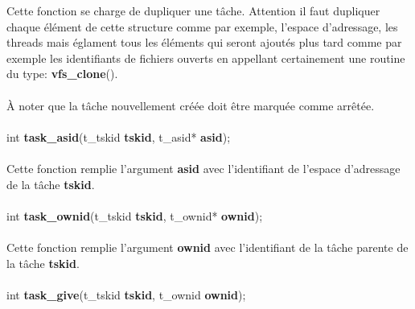 \documentclass[10pt,a4wide]{article}
\begin{document}
Cette fonction se charge de dupliquer une t\^ache. Attention il faut dupliquer
chaque \'el\'ement de cette structure comme par exemple, l'espace d'adressage,
les threads mais \'eglament tous les \'el\'ements qui seront ajout\'es plus
tard comme par exemple les identifiants de fichiers ouverts en appellant
certainement une routine du type: \textbf{vfs\_clone}().

\paragraph{}

\`A noter que la t\^ache nouvellement cr\'e\'ee doit \^etre marqu\'ee comme
arr\^et\'ee.

\paragraph{}

\hspace{1.5cm}int \textbf{task\_asid}(t\_tskid \textbf{tskid},
                                      t\_asid* \textbf{asid});

\paragraph{}

Cette fonction remplie l'argument \textbf{asid} avec l'identifiant de
l'espace d'adressage de la t\^ache \textbf{tskid}.

\paragraph{}

\hspace{1.5cm}int \textbf{task\_ownid}(t\_tskid \textbf{tskid},
                                       t\_ownid* \textbf{ownid});

\paragraph{}

Cette fonction remplie l'argument \textbf{ownid} avec l'identifiant de
la t\^ache parente de la t\^ache \textbf{tskid}.

\paragraph{}

\hspace{1.5cm}int \textbf{task\_give}(t\_tskid \textbf{tskid},
                                      t\_ownid \textbf{ownid});
\end{document}
